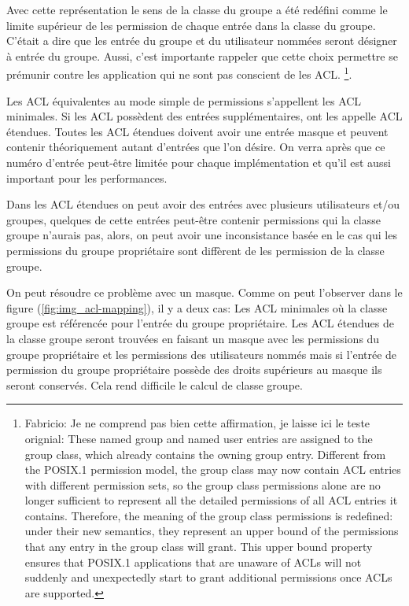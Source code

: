 Avec cette représentation le sens de la classe du groupe a été redéfini comme le limite supérieur de les permission de chaque entrée dans la classe du groupe. C'était a dire que les entrée du groupe et du utilisateur nommées seront désigner à entrée du groupe. Aussi, c'est importante rappeler que cette choix permettre se prémunir contre les application qui ne sont pas conscient de les ACL.
\footnote{Fabricio: Je ne comprend pas bien cette affirmation, je laisse ici le teste orignial:
These named group and named user entries are assigned to the group class, which already contains the owning group entry. Different from the POSIX.1 permission model, the group class may now contain ACL entries with different permission sets, so the group class permissions alone are no longer sufficient to represent all the detailed permissions of all ACL entries it contains. Therefore, the meaning of the group class permissions is redefined: under their new semantics, they represent an upper bound of the permissions that any entry in the group class will grant. This upper bound property ensures that POSIX.1 applications that are unaware of ACLs will not suddenly and unexpectedly start to grant additional permissions once ACLs are supported.}.
 
Les ACL équivalentes au mode simple de permissions s'appellent les ACL minimales. Si les ACL possèdent des entrées supplémentaires, ont les appelle ACL étendues. Toutes les ACL étendues doivent avoir une entrée masque et peuvent contenir théoriquement autant d'entrées que l'on désire. On verra après que ce numéro d'entrée peut-être limitée pour chaque implémentation et qu'il est aussi important pour les performances.
 
Dans les ACL étendues on peut avoir des entrées avec plusieurs utilisateurs et/ou groupes, quelques de cette entrées peut-être contenir permissions qui la classe groupe n'aurais pas, alors, on peut avoir une inconsistance basée en le cas qui les permissions du groupe propriétaire sont diffèrent de les permission de la classe groupe.

 
On peut résoudre ce problème avec un masque. Comme on peut l'observer dans le figure (\ref{fig:img_acl-mapping}), il y a deux cas:  Les ACL minimales où la classe groupe est référencée pour l'entrée du groupe propriétaire. Les ACL étendues de la classe groupe seront trouvées en faisant un masque avec les permissions du groupe propriétaire et les permissions des utilisateurs nommés mais si l'entrée de permission du groupe propriétaire possède des droits supérieurs au masque ils seront conservés. Cela rend difficile le calcul de classe groupe. 

